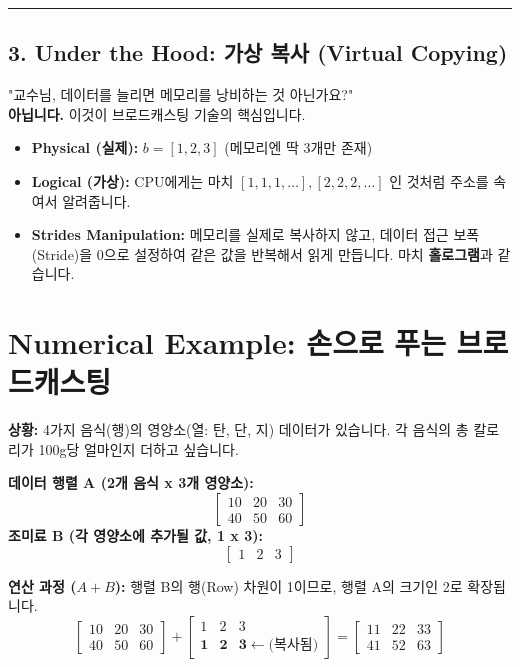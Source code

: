 \documentclass[11pt,a4paper]{book}
\theoremstyle{definition}
\begin{document}
\vspace{0.5cm}\hrule\vspace{0.5cm}

\subsection{3. Under the Hood: 가상 복사 (Virtual Copying)}
"교수님, 데이터를 늘리면 메모리를 낭비하는 것 아닌가요?" \\
\textbf{아닙니다.} 이것이 브로드캐스팅 기술의 핵심입니다.

\begin{itemize}
    \item \textbf{Physical (실제):} $b = [1, 2, 3]$ (메모리엔 딱 3개만 존재)
    \item \textbf{Logical (가상):} CPU에게는 마치 $[1, 1, 1, \dots], [2, 2, 2, \dots]$ 인 것처럼 주소를 속여서 알려줍니다.
    \item \textbf{Strides Manipulation:} 메모리를 실제로 복사하지 않고, 데이터 접근 보폭(Stride)을 0으로 설정하여 같은 값을 반복해서 읽게 만듭니다. 마치 \textbf{홀로그램}과 같습니다.
\end{itemize}

\section{Numerical Example: 손으로 푸는 브로드캐스팅}

\begin{examplebox}[title={칼로리 계산 시나리오}]
\textbf{상황:} 4가지 음식(행)의 영양소(열: 탄, 단, 지) 데이터가 있습니다. 각 음식의 총 칼로리가 100g당 얼마인지 더하고 싶습니다.

\textbf{데이터 행렬 A (2개 음식 x 3개 영양소):}
$$
\begin{bmatrix} 
10 & 20 & 30 \\ 
40 & 50 & 60 
\end{bmatrix} 
$$
\textbf{조미료 B (각 영양소에 추가될 값, 1 x 3):}
$$
\begin{bmatrix} 1 & 2 & 3 \end{bmatrix}
$$

\textbf{연산 과정 ($A + B$):}
행렬 B의 행(Row) 차원이 1이므로, 행렬 A의 크기인 2로 확장됩니다.
$$
\begin{bmatrix} 
10 & 20 & 30 \\ 
40 & 50 & 60 
\end{bmatrix} 
+
\begin{bmatrix} 
1 & 2 & 3 \\ 
\mathbf{1} & \mathbf{2} & \mathbf{3} \leftarrow \text{(복사됨)} 
\end{bmatrix} 
=
\begin{bmatrix} 
11 & 22 & 33 \\ 
41 & 52 & 63 
\end{bmatrix}
$$
\end{examplebox}
\end{document}
